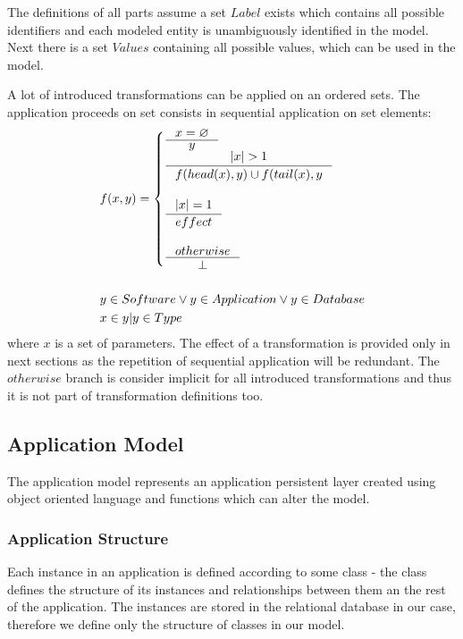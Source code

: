 \documentclass[11pt]{article}
\begin{document}
The definitions of all parts assume a set $Label$ exists which contains all possible identifiers and each modeled entity is unambiguously identified in the model. Next there is a set $Values$ containing all possible values, which can be used in the model. 

A lot of introduced transformations can be applied on an ordered sets. The application proceeds on set consists in sequential application on set elements:
\begin{align*}
& 	f(x, y) = \begin{cases}
 		\inference{x = \varnothing}{y}\\
 		\inference{|x| > 1}{f(head(x), y) \cup f(tail(x), y}\\\\
 		\inference{|x| = 1}{effect}\\\\
 		\inference{otherwise}{\perp}
 \end{cases}\\\\
& y \in Software \vee y \in Application \vee y \in Database \\
& x \in {y | y \in Type}
\end{align*}
where $x$ is a set of parameters. The effect of a transformation is provided only in next sections as the repetition of sequential application will be redundant. The $otherwise$ branch is consider implicit for all introduced transformations and thus it is not part of transformation definitions too. 


\subsection{Application Model}
\label{sec:appModel}
The application model represents an application persistent layer created using object oriented language and functions which can alter the model. 
\subsubsection{Application Structure}
Each instance in an application is defined according to some class - the class defines the structure of its instances and relationships between them an the rest of the application. The instances are stored in the relational database in our case, therefore we define only the structure of classes in our model. 
\end{document}
